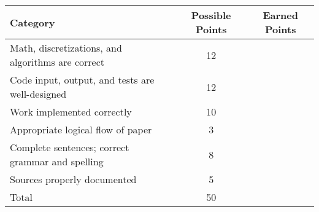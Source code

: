 \documentclass[a4paper, 12 pt]{curve}
\begin{document}
\vspace{2em}
\begin{center}
\begin{tabu}{| X | c | c |}\hline
\textbf{Category} & \textbf{Possible Points} & \textbf{Earned Points} \\ \hline \hline
Math, discretizations, and algorithms are correct & 12 & \\ \hline
Code input, output, and tests are well-designed & 12 & \\ \hline
Work implemented correctly & 10 & \\ \hline
Appropriate logical flow of paper & 3 & \\ \hline
Complete sentences; correct grammar and spelling & 8 & \\ \hline
Sources properly documented & 5 & \\ \hline
Total & 50 & \\\hline
\end{tabu} 
\end{center}
\end{document}
